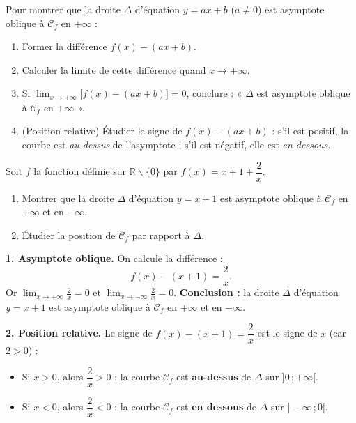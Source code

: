\documentclass[11pt]{article}
\newcommand{\cle}[1]{{\popxbold\color{popdark}#1}}
\def\setminus{\mathbin{\backslash}}\let\smallsetminus\setminus
\begin{document}
\begin{methode}[Montrer qu'une droite $y = ax+b$ est asymptote oblique]
Pour montrer que la droite $\Delta$ d'équation $y=ax+b$ ($a\neq 0$) est \cle{asymptote oblique} à $\mathcal{C}_f$ en $+\infty$ :
\begin{enumerate}
\item Former la différence $f(x)-(ax+b)$.
\item Calculer la limite de cette différence quand $x\to+\infty$.
\item Si $\displaystyle\lim_{x\to+\infty}\big[f(x)-(ax+b)\big]=0$, conclure : « $\Delta$ est asymptote oblique à $\mathcal{C}_f$ en $+\infty$ ».
\item (Position relative) Étudier le signe de $f(x)-(ax+b)$ : s'il est positif, la courbe est \emph{au-dessus} de l'asymptote ; s'il est négatif, elle est \emph{en dessous}.
\end{enumerate}
\end{methode}

\begin{exoresolu}
Soit $f$ la fonction définie sur $\mathbb{R}\setminus\{0\}$ par $f(x)=x+1+\dfrac{2}{x}$.
\begin{enumerate}
\item Montrer que la droite $\Delta$ d'équation $y=x+1$ est asymptote oblique à $\mathcal{C}_f$ en $+\infty$ et en $-\infty$.
\item Étudier la position de $\mathcal{C}_f$ par rapport à $\Delta$.
\end{enumerate}
\tcblower
\textbf{1. Asymptote oblique.} On calcule la différence :
\[ f(x)-(x+1)=\frac{2}{x}. \]
Or $\displaystyle\lim_{x\to+\infty}\frac{2}{x}=0$ et $\displaystyle\lim_{x\to-\infty}\frac{2}{x}=0$.
\textbf{Conclusion :} la droite $\Delta$ d'équation $y=x+1$ est asymptote oblique à $\mathcal{C}_f$ en $+\infty$ et en $-\infty$.

\textbf{2. Position relative.} Le signe de $f(x)-(x+1)=\dfrac{2}{x}$ est le signe de $x$ (car $2>0$) :
\begin{itemize}
\item Si $x>0$, alors $\dfrac{2}{x}>0$ : la courbe $\mathcal{C}_f$ est \textbf{au-dessus} de $\Delta$ sur $]0\,;+\infty[$.
\item Si $x<0$, alors $\dfrac{2}{x}<0$ : la courbe $\mathcal{C}_f$ est \textbf{en dessous} de $\Delta$ sur $]-\infty\,;0[$.
\end{itemize}
\end{exoresolu}
\end{document}
